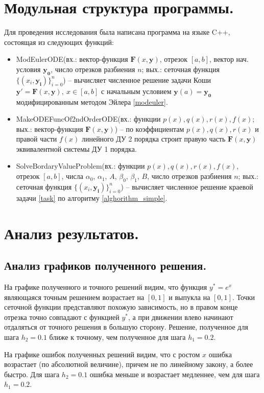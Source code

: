 \documentclass[a4paper, 12pt]{article}
\begin{document}
	\section{Модульная структура программы.}
	Для проведения исследования была написана программа на языке C++, состоящая из следующих функций:
	\begin{itemize}
		\item ModEulerODE(вх.: вектор-функция $\mathbf{F}(x,\mathbf{y})$, отрезок $[a,b]$, вектор нач. условия $\mathbf{y_0}$, число отрезков разбиения $n$; вых.: сеточная функция $\{(x_i,\mathbf{y_i})\}_{i=0}^n$) -- вычисляет численное решение задачи Коши $\mathbf{y'}=\mathbf{F}(x,\mathbf{y}),\ x\in[a,b]$ с начальным условием $\mathbf{y}(a)=\mathbf{y_0}$ модифицированным методом Эйлера \eqref{modeuler}.
		\item MakeODEFuncOf2ndOrderODE(вх.: функции $p(x),q(x),r(x),f(x)$; вых.: вектор-функция $\mathbf{F}(x,\mathbf{y})$) -- по коэффициентам $p(x),q(x),r(x)$ и правой части $f(x)$ линейного ДУ 2 порядка строит правую часть $\mathbf{F}(x,\mathbf{y})$ эквивалентной системы ДУ 1 порядка.
		\item SolveBordaryValueProblem(вх.: функции $p(x),q(x),r(x),f(x)$, отрезок $[a,b]$, числа $\alpha_0$, $\alpha_1$, $A$, $\beta_0$, $\beta_1$, $B$, число отрезков разбиения $n$; вых.: сеточная функция $\{(x_i,\mathbf{y_i})\}_{i=0}^n$) -- вычисляет численное решение краевой задачи \eqref{task} по алгоритму \ref{alghorithm_simple}.
	\end{itemize}
	
	\section{Анализ результатов.}
	
	\subsection{Анализ графиков полученного решения.}
	
	На графике полученного и точного решений видим, что функция $y^*=e^x$ являющаяся точным решением возрастает на $[0,1]$ и выпукла на $[0,1]$. Точки сеточной функции представляют похожую зависимость, но в правом конце отрезка точно совпадают с функцией $y^*$, а при движении влево начинают отдаляться от точного решения в большую сторону. Решение, полученное для шага $h_2=0.1$ ближе к точному, чем полученное для шага $h_1=0.2$.
	
	На графике ошибок полученных решений видим, что с ростом $x$ ошибка возрастает (по абсолютной величине), причем не по линейному закону, а более быстро. Для шага $h_2=0.1$ ошибка меньше и возрастает медленнее, чем для шага $h_1=0.2$. 
	
\end{document}

